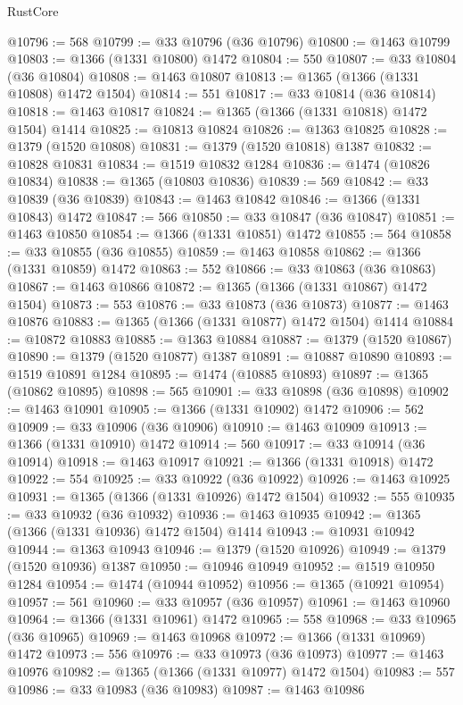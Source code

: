 \begin{lexlean}{RustCore}
\begin{coremodule}
@10796 := 568
@10799 := @33 @10796 (@36 @10796)
@10800 := @1463 @10799
@10803 := @1366 (@1331 @10800) @1472
@10804 := 550
@10807 := @33 @10804 (@36 @10804)
@10808 := @1463 @10807
@10813 := @1365 (@1366 (@1331 @10808) @1472 @1504)
@10814 := 551
@10817 := @33 @10814 (@36 @10814)
@10818 := @1463 @10817
@10824 := @1365 (@1366 (@1331 @10818) @1472 @1504) @1414
@10825 := @10813 @10824
@10826 := @1363 @10825
@10828 := @1379 (@1520 @10808)
@10831 := @1379 (@1520 @10818) @1387
@10832 := @10828 @10831
@10834 := @1519 @10832 @1284
@10836 := @1474 (@10826 @10834)
@10838 := @1365 (@10803 @10836)
@10839 := 569
@10842 := @33 @10839 (@36 @10839)
@10843 := @1463 @10842
@10846 := @1366 (@1331 @10843) @1472
@10847 := 566
@10850 := @33 @10847 (@36 @10847)
@10851 := @1463 @10850
@10854 := @1366 (@1331 @10851) @1472
@10855 := 564
@10858 := @33 @10855 (@36 @10855)
@10859 := @1463 @10858
@10862 := @1366 (@1331 @10859) @1472
@10863 := 552
@10866 := @33 @10863 (@36 @10863)
@10867 := @1463 @10866
@10872 := @1365 (@1366 (@1331 @10867) @1472 @1504)
@10873 := 553
@10876 := @33 @10873 (@36 @10873)
@10877 := @1463 @10876
@10883 := @1365 (@1366 (@1331 @10877) @1472 @1504) @1414
@10884 := @10872 @10883
@10885 := @1363 @10884
@10887 := @1379 (@1520 @10867)
@10890 := @1379 (@1520 @10877) @1387
@10891 := @10887 @10890
@10893 := @1519 @10891 @1284
@10895 := @1474 (@10885 @10893)
@10897 := @1365 (@10862 @10895)
@10898 := 565
@10901 := @33 @10898 (@36 @10898)
@10902 := @1463 @10901
@10905 := @1366 (@1331 @10902) @1472
@10906 := 562
@10909 := @33 @10906 (@36 @10906)
@10910 := @1463 @10909
@10913 := @1366 (@1331 @10910) @1472
@10914 := 560
@10917 := @33 @10914 (@36 @10914)
@10918 := @1463 @10917
@10921 := @1366 (@1331 @10918) @1472
@10922 := 554
@10925 := @33 @10922 (@36 @10922)
@10926 := @1463 @10925
@10931 := @1365 (@1366 (@1331 @10926) @1472 @1504)
@10932 := 555
@10935 := @33 @10932 (@36 @10932)
@10936 := @1463 @10935
@10942 := @1365 (@1366 (@1331 @10936) @1472 @1504) @1414
@10943 := @10931 @10942
@10944 := @1363 @10943
@10946 := @1379 (@1520 @10926)
@10949 := @1379 (@1520 @10936) @1387
@10950 := @10946 @10949
@10952 := @1519 @10950 @1284
@10954 := @1474 (@10944 @10952)
@10956 := @1365 (@10921 @10954)
@10957 := 561
@10960 := @33 @10957 (@36 @10957)
@10961 := @1463 @10960
@10964 := @1366 (@1331 @10961) @1472
@10965 := 558
@10968 := @33 @10965 (@36 @10965)
@10969 := @1463 @10968
@10972 := @1366 (@1331 @10969) @1472
@10973 := 556
@10976 := @33 @10973 (@36 @10973)
@10977 := @1463 @10976
@10982 := @1365 (@1366 (@1331 @10977) @1472 @1504)
@10983 := 557
@10986 := @33 @10983 (@36 @10983)
@10987 := @1463 @10986

\end{coremodule}
\end{lexlean}
